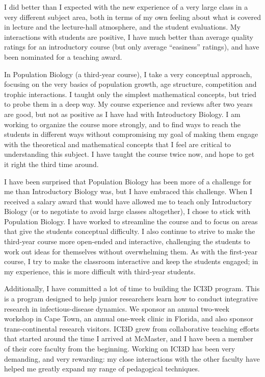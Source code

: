 \documentclass[12pt]{article}
\begin{document}
I did better than I expected with the new experience of a very large class in a very different subject area, both in terms of my own feeling about what is covered in lecture and the lecture-hall atmosphere, and the student evaluations.  My interactions with students are positive, I have much better than average quality ratings for an introductory course (but only average ``easiness'' ratings), and have been nominated for a teaching award.

In Population Biology (a third-year course), I take a very conceptual approach, focusing on the very basics of population growth, age structure, competition and trophic interactions.  I taught only the simplest mathematical concepts, but tried to probe them in a deep way.  My course experience and reviews after two years are good, but not as positive as I have had with Introductory Biology.  I am working to organize the course more strongly, and to find ways to reach the students in different ways without compromising my goal of making them engage with the theoretical and mathematical concepts that I feel are critical to understanding this subject.  I have taught the course twice now, and hope to get it right the third time around.

I have been surprised that Population Biology has been more of a challenge for me than Introductory Biology was, but I have embraced this challenge. When I received a salary award that would have allowed me to teach only Introductory Biology (or to negotiate to avoid large classes altogether), I chose to stick with Population Biology.  I have worked to streamline the course and to focus on areas that give the students conceptual difficulty. I also continue to strive to make the third-year course more open-ended and interactive, challenging the students to work out ideas for themselves without overwhelming them.  As with the first-year course, I try to make the classroom interactive and keep the students engaged; in my experience, this is more difficult with third-year students.

Additionally, I have committed a lot of time to building the ICI3D program. This is a program designed to help junior researchers learn how to conduct integrative research in infectious-disease dynamics. We sponsor an annual two-week workshop in Cape Town, an annual one-week clinic in Florida, and also sponsor trans-continental research visitors. ICI3D grew from collaborative teaching efforts that started around the time I arrived at McMaster, and I have been a member of their core faculty from the beginning. Working on ICI3D has been very demanding, and very rewarding: my close interactions with the other faculty have helped me greatly expand my range of pedagogical techniques.
\end{document}
